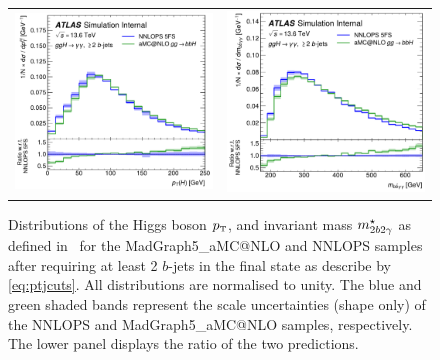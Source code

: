 \documentclass[11pt,a4paper]{article}
\begin{document}
\begin{figure}[t!]
\begin{center}
\begin{tabular}{cc}
\includegraphics[width=.45\textwidth, page=1]{plots/ATLAS/BJetCuts_Higgs1_Pt_shape_comparison_ratio.pdf}&
\includegraphics[width=.44\textwidth, page=1]{plots/ATLAS/BJetCuts_yybb_Mass_shape_comparison_ratio.pdf}
\end{tabular}
\vspace*{1ex}
\caption{Distributions of the Higgs boson $\pt$, and invariant mass $m_{2b2\gamma}^{\star}$ as defined in~  for the {\sc MadGraph5\_aMC@NLO} and {\sc NNLOPS} samples after requiring at least 2 $b$-jets in the final state as describe by \eqref{eq:ptjcuts}. All distributions are normalised to unity. The blue and green shaded bands represent the scale uncertainties (shape only) of the {\sc NNLOPS} and {\sc MadGraph5\_aMC@NLO} samples, respectively. The lower panel displays the ratio of the two predictions.~\cite{atlaspub}\label{fig:4fsNNLOPS}}
\end{center}
\end{figure}

\end{document}
